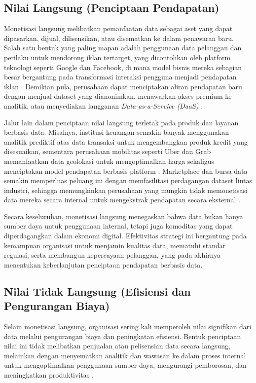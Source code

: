 \subsection{Nilai Langsung (Penciptaan Pendapatan)}

Monetisasi langsung melibatkan pemanfaatan data sebagai aset yang dapat dipasarkan, dijual, dilisensikan, atau disematkan ke dalam penawaran baru. Salah satu bentuk yang paling mapan adalah penggunaan data pelanggan dan perilaku untuk mendorong iklan tertarget, yang dicontohkan oleh platform teknologi seperti Google dan Facebook, di mana model bisnis mereka sebagian besar bergantung pada transformasi interaksi pengguna menjadi pendapatan iklan \cite{tucker2014social,bergemann2019data}. Demikian pula, perusahaan dapat menciptakan aliran pendapatan baru dengan menjual dataset yang dianonimkan, menawarkan akses premium ke analitik, atau menyediakan langganan \textit{Data-as-a-Service (DaaS)} \cite{lim2018business,liu2020dataservice}.

Jalur lain dalam penciptaan nilai langsung terletak pada produk dan layanan berbasis data. Misalnya, institusi keuangan semakin banyak menggunakan analitik prediktif atas data transaksi untuk mengembangkan produk kredit yang disesuaikan, sementara perusahaan mobilitas seperti Uber dan Grab memanfaatkan data geolokasi untuk mengoptimalkan harga sekaligus menciptakan model pendapatan berbasis platform \cite{meeker2019internet}. Marketplace dan bursa data semakin memperluas peluang ini dengan memfasilitasi perdagangan dataset lintas industri, sehingga memungkinkan perusahaan yang mungkin tidak memonetisasi data mereka secara internal untuk mengekstrak pendapatan secara eksternal \cite{zuiderwijk2021data}.

Secara keseluruhan, monetisasi langsung menegaskan bahwa data bukan hanya sumber daya untuk penggunaan internal, tetapi juga komoditas yang dapat diperdagangkan dalam ekonomi digital. Efektivitas strategi ini bergantung pada kemampuan organisasi untuk menjamin kualitas data, mematuhi standar regulasi, serta membangun kepercayaan pelanggan, yang pada akhirnya menentukan keberlanjutan penciptaan pendapatan berbasis data.

\subsection{Nilai Tidak Langsung (Efisiensi dan Pengurangan Biaya)}

Selain monetisasi langsung, organisasi sering kali memperoleh nilai signifikan dari data melalui pengurangan biaya dan peningkatan efisiensi. Bentuk penciptaan nilai ini tidak melibatkan penjualan atau pelisensian data secara langsung, melainkan dengan menyematkan analitik dan wawasan ke dalam proses internal untuk mengoptimalkan penggunaan sumber daya, mengurangi pemborosan, dan meningkatkan produktivitas \cite{porter2014smart}.

